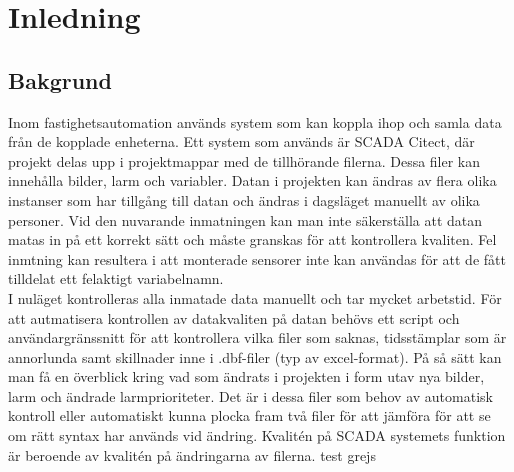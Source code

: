 \section{Inledning}



\subsection{Bakgrund}


Inom fastighetsautomation används system som kan koppla ihop och samla data från de kopplade enheterna. Ett system som används är SCADA Citect, där projekt delas upp i projektmappar med de tillhörande filerna. Dessa filer kan innehålla bilder, larm och variabler. Datan i projekten kan ändras av flera olika instanser som har tillgång till datan och ändras i dagsläget manuellt av olika personer. Vid den nuvarande inmatningen kan man inte säkerställa att datan matas in på ett korrekt sätt och måste granskas för att kontrollera kvaliten. Fel inmtning kan resultera i att monterade sensorer inte kan användas för att de fått tilldelat ett felaktigt variabelnamn. 
\\[5mm]

I nuläget kontrolleras alla inmatade data manuellt och tar mycket arbetstid. För att autmatisera kontrollen av datakvaliten på datan behövs ett script och användargränssnitt för att kontrollera vilka filer som saknas, tidsstämplar som är annorlunda samt skillnader inne i .dbf-filer (typ av excel-format). På så sätt kan man få en överblick kring vad som ändrats i projekten i form utav nya bilder, larm och ändrade larmprioriteter. Det är i dessa filer som behov av automatisk kontroll eller automatiskt kunna plocka fram två filer för att jämföra för att se om rätt syntax har används vid ändring. Kvalitén på SCADA systemets funktion är beroende av kvalitén på ändringarna av filerna.
test grejs




